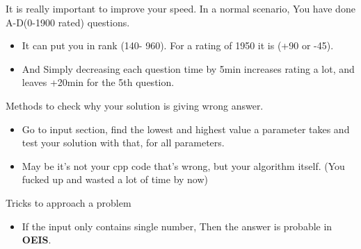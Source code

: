 \documentclass[a4paper,12pt]{report}
\begin{document}
It is really important to improve your speed. In a normal scenario, You have done A-D(0-1900 rated) questions.
\begin{itemize}
	\item  It can put you in rank (140- 960). For a rating of 1950 it is 
	(+90 or -45).
	\item And Simply decreasing each question time by 5min increases rating a lot, and leaves +20min for the 5th question.
\end{itemize}

Methods to check why your solution is giving wrong answer.
\begin{itemize}
	\item Go to input section, find the lowest and highest value a parameter takes and test your solution with that, for all parameters.
	\item May be it's not your cpp code that's wrong, but your algorithm itself. (You fucked up and wasted a lot of time by now)
\end{itemize}

Tricks to approach a problem
\begin{itemize}
	\item If the input only contains single number, Then the answer is probable in \textbf{OEIS}.
\end{itemize}











\end{document}
